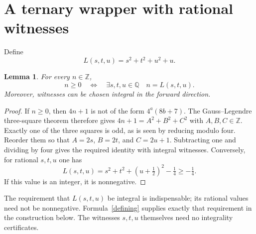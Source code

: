 \documentclass[11pt,a4paper]{article}
\newtheorem{lemma}[theorem]{Lemma}
\newcommand{\Q}{\mathbb Q}\newcommand{\Z}{\mathbb Z}\newcommand{\N}{\mathbb N}
\begin{document}
\section{A ternary wrapper with rational witnesses}
Define
\[
 L(s,t,u)=s^2+t^2+u^2+u.
\]
\begin{lemma}\label{wrapper}
For every $n\in\Z$,
\[
 n\ge0\quad\Longleftrightarrow\quad
 \exists s,t,u\in\Q\quad n=L(s,t,u).
\]
Moreover, witnesses can be chosen integral in the forward direction.
\end{lemma}
\begin{proof}
If $n\ge0$, then $4n+1$ is not of the form $4^a(8b+7)$. The
Gauss--Legendre three-square theorem therefore gives
$4n+1=A^2+B^2+C^2$ with $A,B,C\in\Z$. Exactly one of the three
squares is odd, as is seen by reducing modulo four. Reorder them so that
$A=2s$, $B=2t$, and $C=2u+1$. Subtracting one and dividing by four gives
the required identity with integral witnesses. Conversely, for rational
$s,t,u$ one has
\[
 L(s,t,u)=s^2+t^2+(u+\tfrac12)^2-\tfrac14\ge-\tfrac14.
\]
If this value is an integer, it is nonnegative.
\end{proof}

The requirement that $L(s,t,u)$ be integral is indispensable; its rational
values need not be nonnegative. Formula~\eqref{defining} supplies exactly that
requirement in the construction below. The witnesses $s,t,u$ themselves
need no integrality certificates.
\end{document}
